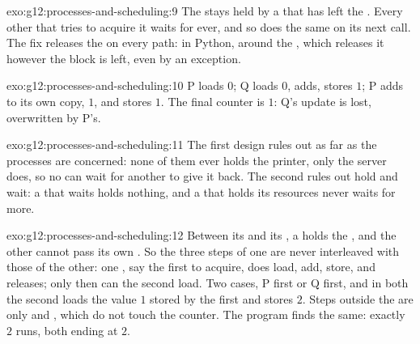\begin{solution}{exo:g12:processes-and-scheduling:9}
The  stays held by a  that has left the . Every other  that tries to acquire it
waits for ever, and so does the same  on its next call. The fix releases the  on every path: in Python,
 around the , which releases it however the block is left, even by an exception.
\end{solution}

\begin{solution}{exo:g12:processes-and-scheduling:10}
P loads $0$; Q loads $0$, adds, stores $1$; P adds to its own copy, $1$, and stores $1$. The final counter is $1$: Q's
update is lost, overwritten by P's.
\end{solution}

\begin{solution}{exo:g12:processes-and-scheduling:11}
The first design rules out  as far as the processes are concerned: none of them ever holds the
printer, only the server does, so no  can wait for another to give it back. The second rules out hold and
wait: a  that waits holds nothing, and a  that holds its resources never waits for more.
\end{solution}

\begin{solution}{exo:g12:processes-and-scheduling:12}
Between its  and its , a  holds the , and the other cannot pass its own
. So the three steps of one  are never interleaved with those of the other: one , say the
first to acquire, does load, add, store, and releases; only then can the second load. Two cases, P first or Q first,
and in both the second  loads the value $1$ stored by the first and stores $2$. Steps outside the  are
only  and , which do not touch the counter. The program finds the same: exactly $2$ runs,
both ending at $2$.
\end{solution}

